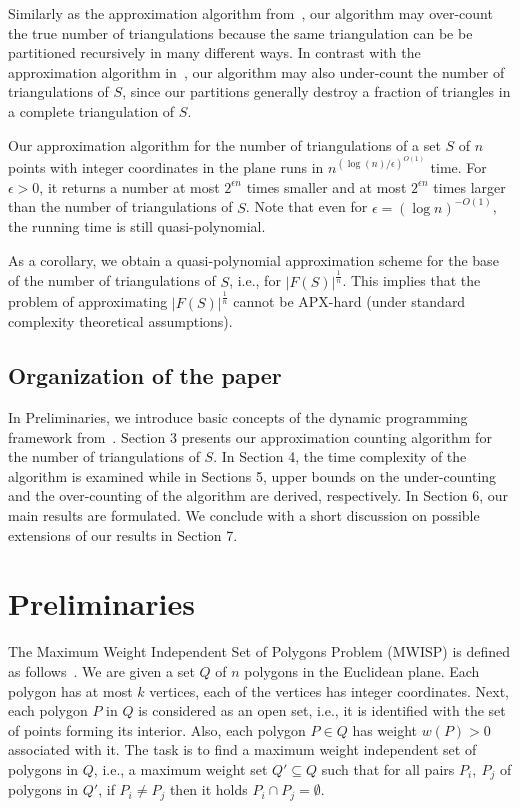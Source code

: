 \documentclass[a4paper]{article}
\begin{document}
Similarly as the approximation algorithm
from~\cite{ABRS13}, our algorithm may over-count
the true number of triangulations
because the same triangulation can
be be partitioned recursively in many different
ways. In contrast with the approximation algorithm in~\cite{ABRS13},
our  algorithm may also under-count the
number of triangulations of $S$, since our
partitions generally destroy a fraction
of triangles in a complete triangulation of $S$.

Our approximation
algorithm for 
the number of triangulations of a set $S$
of $n$ points with integer coordinates in the plane
runs 
in $n^{(\log (n) /\epsilon)^{O(1)}}$ time.
For $\epsilon > 0$, it returns
a number at most $2^{\epsilon n}$ times
smaller and at most $2^{\epsilon n}$ times
larger than the number of triangulations
of $S$. Note that even for 
$\epsilon = (\log n )^{-O(1)}$,
the running time is still quasi-polynomial.

As a corollary, we obtain
 a quasi-polynomial approximation
scheme for the base of the number of triangulations
of $S$, i.e., for $|F(S)|^{\frac 1n}$.
This implies that the problem of
approximating $|F(S)|^{\frac 1n}$ cannot be
APX-hard (under standard complexity theoretical
assumptions).

\subsection{Organization of the paper}
In Preliminaries, we introduce 
basic concepts of the dynamic programming
framework from~\cite{AW13}. Section 3 presents
our approximation counting algorithm for the number
of triangulations of $S$. In Section 4,
the time complexity of the algorithm is
examined while in Sections 5, upper bounds
on the under-counting and the over-counting
of the algorithm are derived, respectively.
In Section 6, our main results are formulated.
We conclude with a short discussion on
possible extensions of our results in Section 7.

\section{Preliminaries}

The Maximum Weight Independent Set of Polygons Problem
(MWISP) is defined as follows~\cite{AW14}.
We are given a set ${Q}$  of $n$ polygons in the Euclidean plane.
Each polygon has at most $k$ vertices, each of the vertices
has integer coordinates. Next, each polygon $P$ in $Q$
is considered
as an open set, i.e., it is identified with the set
of points forming its interior. Also, each polygon 
$P\in Q$ has weight $w(P)>0$ associated with it. The task
is to find a maximum weight independent set of polygons
in $Q$, i.e., a maximum weight set $Q'\subseteq Q$ such that for all
pairs $P_i,\ P_j$ of polygons in $Q'$, if $P_i \neq P_j$
then it holds $P_i \cap P_j = \emptyset $.
\end{document}
